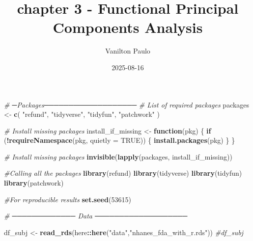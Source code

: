 \documentclass[
]{article}
\title{chapter 3 - Functional Principal Components Analysis}
\author{Vanilton Paulo}
\date{2025-08-16}
\newenvironment{Shaded}{\begin{snugshade}}{\end{snugshade}}
\newcommand{\AttributeTok}[1]{\textcolor[rgb]{0.13,0.29,0.53}{#1}}
\newcommand{\CommentTok}[1]{\textcolor[rgb]{0.56,0.35,0.01}{\textit{#1}}}
\newcommand{\ConstantTok}[1]{\textcolor[rgb]{0.56,0.35,0.01}{#1}}
\newcommand{\ControlFlowTok}[1]{\textcolor[rgb]{0.13,0.29,0.53}{\textbf{#1}}}
\newcommand{\DecValTok}[1]{\textcolor[rgb]{0.00,0.00,0.81}{#1}}
\newcommand{\FunctionTok}[1]{\textcolor[rgb]{0.13,0.29,0.53}{\textbf{#1}}}
\newcommand{\NormalTok}[1]{#1}
\newcommand{\OtherTok}[1]{\textcolor[rgb]{0.56,0.35,0.01}{#1}}
\newcommand{\SpecialCharTok}[1]{\textcolor[rgb]{0.81,0.36,0.00}{\textbf{#1}}}
\newcommand{\StringTok}[1]{\textcolor[rgb]{0.31,0.60,0.02}{#1}}
\begin{document}
\maketitle

\begin{Shaded}
\begin{Highlighting}[]
\CommentTok{\# ─Packages───────────────────}
\CommentTok{\# List of required packages}
\NormalTok{packages }\OtherTok{\textless{}{-}} \FunctionTok{c}\NormalTok{(}
  \StringTok{"refund"}\NormalTok{,}
  \StringTok{"tidyverse"}\NormalTok{,}
  \StringTok{"tidyfun"}\NormalTok{,}
  \StringTok{"patchwork"}
\NormalTok{)}

\CommentTok{\# Install missing packages}
\NormalTok{install\_if\_missing }\OtherTok{\textless{}{-}} \ControlFlowTok{function}\NormalTok{(pkg) \{}
  \ControlFlowTok{if}\NormalTok{ (}\SpecialCharTok{!}\FunctionTok{requireNamespace}\NormalTok{(pkg, }\AttributeTok{quietly =} \ConstantTok{TRUE}\NormalTok{)) \{}
    \FunctionTok{install.packages}\NormalTok{(pkg)}
\NormalTok{  \}}
\NormalTok{\}}

\CommentTok{\# Install missing packages}
\FunctionTok{invisible}\NormalTok{(}\FunctionTok{lapply}\NormalTok{(packages, install\_if\_missing))}



\CommentTok{\#Calling all the packages }
\FunctionTok{library}\NormalTok{(refund)      }
\FunctionTok{library}\NormalTok{(tidyverse)   }
\FunctionTok{library}\NormalTok{(tidyfun)}
\FunctionTok{library}\NormalTok{(patchwork)}


\CommentTok{\#For reproducible results}
\FunctionTok{set.seed}\NormalTok{(}\DecValTok{53615}\NormalTok{)}
\end{Highlighting}
\end{Shaded}

\begin{Shaded}
\begin{Highlighting}[]
\CommentTok{\# ───────────── Data ───────────────────}

\NormalTok{df\_subj }\OtherTok{\textless{}{-}} \FunctionTok{read\_rds}\NormalTok{(here}\SpecialCharTok{::}\FunctionTok{here}\NormalTok{(}\StringTok{"data"}\NormalTok{,}\StringTok{"nhanes\_fda\_with\_r.rds"}\NormalTok{))}
\CommentTok{\#df\_subj}
\end{Highlighting}
\end{Shaded}
\end{document}

